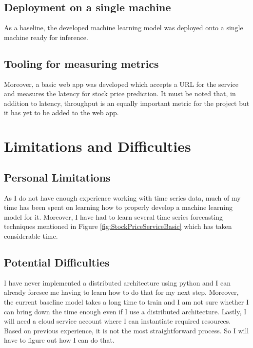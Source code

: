 \documentclass{report}
\begin{document}
\section{Deployment on a single machine}

As a baseline, the developed machine learning model was deployed onto a single machine ready for inference.

\section{Tooling for measuring metrics}

Moreover, a basic web app was developed which accepts a URL for the service and measures the latency for stock price prediction. It must be noted that, in addition to latency, throughput is an equally important metric for the project but it has yet to be added to the web app.

\chapter{Limitations and Difficulties}\label{chap:limitations}
\section{Personal Limitations}
As I do not have enough experience working with time series data, much of my time has been spent on learning how to properly develop a machine learning model for it. Moreover, I have had to learn several time series forecasting techniques mentioned in Figure \ref{fig:StockPriceServiceBasic} which has taken considerable time.

\section{Potential Difficulties}
I have never implemented a distributed architecture using python and I can already foresee me having to learn how to do that for my next step. Moreover, the current baseline model takes a long time to train and I am not sure whether I can bring down the time enough even if I use a distributed architecture. Lastly, I will need a cloud service account where I can instantiate required resources. Based on previous experience, it is not the most straightforward process. So I will have to figure out how I can do that.
\end{document}
